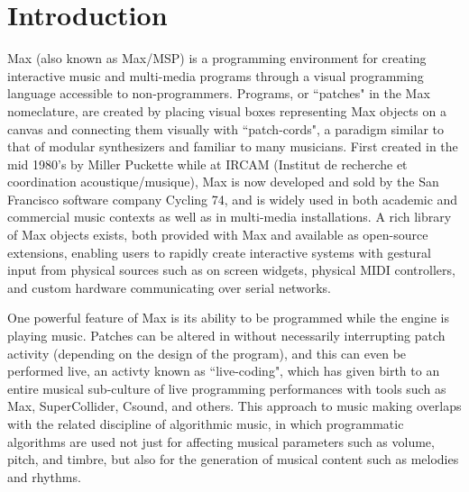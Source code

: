 \documentclass[acmsmall]{acmart}
\begin{document}
\maketitle

\section{Introduction}


Max (also known as Max/MSP) is a programming environment for creating interactive 
music and multi-media programs through a visual programming language accessible 
to non-programmers.  Programs, or ``patches" in the Max nomeclature, are created by placing
visual boxes representing Max objects on a canvas and connecting them visually with
``patch-cords", a paradigm similar to that of modular synthesizers and familiar to many musicians.
First created in the mid 1980's by Miller Puckette while at IRCAM 
(Institut de recherche et coordination acoustique/musique), 
Max is now developed and sold by the San Francisco software company Cycling 74,
and is widely used in both academic and commercial music contexts as well
as in multi-media installations. A rich library of Max objects exists, 
both provided with Max and available as open-source 
extensions, enabling users to rapidly create interactive systems with gestural 
input from physical sources such as on screen widgets, physical MIDI controllers,
and custom hardware communicating over serial networks.


One powerful feature of Max is its ability to be programmed
while the engine is playing music. Patches can be altered in 
without necessarily interrupting patch activity (depending on the design
of the program), and this can
even be performed live, an activty known as ``live-coding", which has given
birth to an entire musical sub-culture of live programming performances
with tools such as Max, SuperCollider, Csound, and others. 
This approach to music making overlaps with the related discipline of 
algorithmic music, in which programmatic algorithms are used
not just for affecting musical parameters such as volume, pitch, and timbre, 
but also for the generation of musical content such as melodies
and rhythms.
\end{document}
